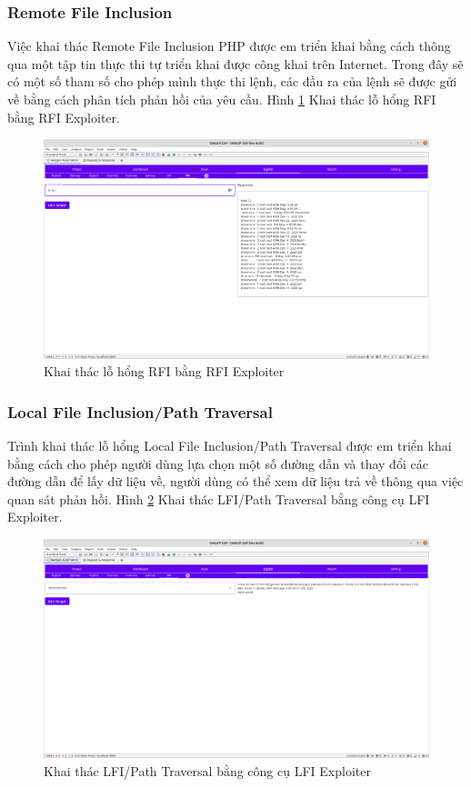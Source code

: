 \documentclass[./../main.tex]{subfiles}
\begin{document}
\subsubsection{Remote File Inclusion}

Việc khai thác Remote File Inclusion PHP được em triển khai bằng cách thông qua một tập tin thực thi tự triển khai được công khai trên Internet. Trong đây sẽ có một số tham số cho phép mình thực thi lệnh, các đầu ra của lệnh sẽ được gửi về bằng cách phân tích phản hồi của yêu cầu.
Hình \ref{fig:rfi_exploit} Khai thác lỗ hổng RFI bằng RFI Exploiter.

\begin{figure}[h!]
	\includegraphics[width=\linewidth]{./images/rfi_exploit.png}
	\caption{Khai thác lỗ hổng RFI bằng RFI Exploiter}
	\label{fig:rfi_exploit}
\end{figure}
\subsubsection{Local File Inclusion/Path Traversal}

Trình khai thác lỗ hổng Local File Inclusion/Path Traversal được em triển khai bằng cách cho phép người dùng lựa chọn một số đường dẫn và thay đổi các đường dẫn để lấy dữ liệu về, người dùng có thể xem dữ liệu trả về thông qua việc quan sát phản hồi.
Hình \ref{fig:lfi_exploit} Khai thác LFI/Path Traversal bằng công cụ LFI Exploiter.

\begin{figure}[h!]
	\includegraphics[width=\linewidth]{./images/lfi_exploit.png}
	\caption{Khai thác LFI/Path Traversal bằng công cụ LFI Exploiter}
	\label{fig:lfi_exploit}
\end{figure}
\end{document}

